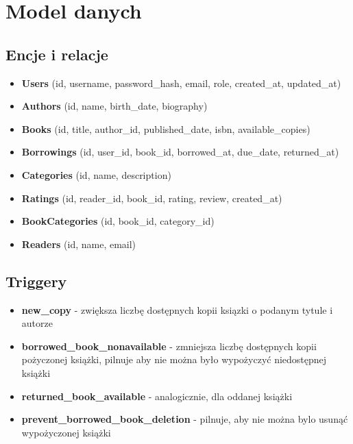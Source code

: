 \documentclass{article}
\begin{document}
\section*{Model danych}
\subsection*{Encje i relacje}
\begin{itemize}
    \item \textbf{Users} (id, username, password\_hash, email, role, created\_at, updated\_at)
    \item \textbf{Authors} (id, name, birth\_date, biography)
    \item \textbf{Books} (id, title, author\_id, published\_date, isbn, available\_copies)
    \item \textbf{Borrowings} (id, user\_id, book\_id, borrowed\_at, due\_date, returned\_at)
    \item \textbf{Categories} (id, name, description)
    \item \textbf{Ratings} (id, reader\_id, book\_id, rating, review, created\_at)
    \item \textbf{BookCategories} (id, book\_id, category\_id)
    \item \textbf{Readers} (id, name, email)
\end{itemize}

\subsection*{Triggery}
\begin{itemize}
    \item \textbf{new\_copy} - zwiększa liczbę dostępnych kopii ksiązki o podanym tytule i autorze
    \item \textbf{borrowed\_book\_nonavailable} - zmniejsza liczbę dostępnych kopii pożyczonej książki, pilnuje aby nie można było wypożyczyć niedostępnej książki
    \item \textbf{returned\_book\_available} - analogicznie, dla oddanej książki
    \item \textbf{prevent\_borrowed\_book\_deletion} - pilnuje, aby nie można bylo usunąć wypożyczonej książki
\end{itemize}
\end{document}
